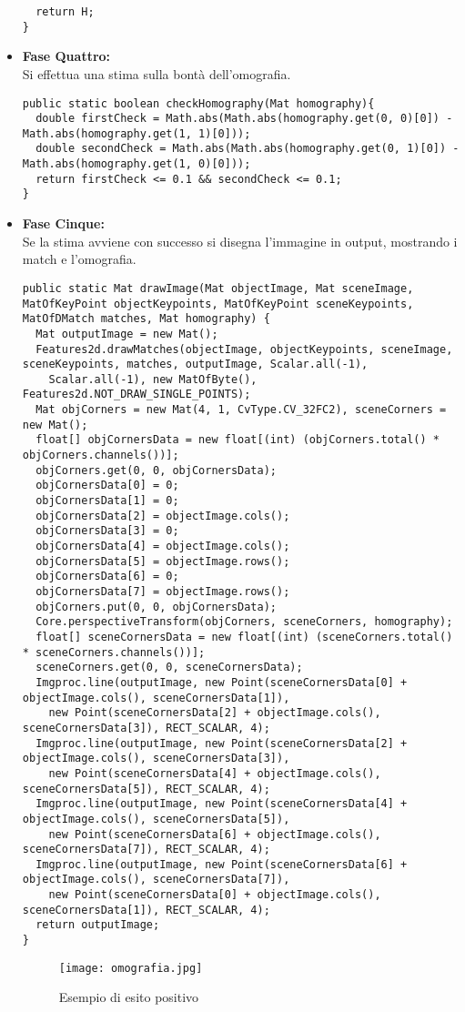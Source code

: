 \begin{itemize}
\begin{lstlisting}
  return H;
}
\end{lstlisting}
	\item \textbf{Fase Quattro:}\\
	Si effettua una stima sulla bontà dell'omografia.
\begin{lstlisting}
public static boolean checkHomography(Mat homography){
  double firstCheck = Math.abs(Math.abs(homography.get(0, 0)[0]) - Math.abs(homography.get(1, 1)[0]));
  double secondCheck = Math.abs(Math.abs(homography.get(0, 1)[0]) - Math.abs(homography.get(1, 0)[0]));
  return firstCheck <= 0.1 && secondCheck <= 0.1;
}
\end{lstlisting}
	\item \textbf{Fase Cinque:}\\
	Se la stima avviene con successo si disegna l'immagine in output, mostrando i match e l'omografia.
\begin{lstlisting}
public static Mat drawImage(Mat objectImage, Mat sceneImage, MatOfKeyPoint objectKeypoints, MatOfKeyPoint sceneKeypoints, MatOfDMatch matches, Mat homography) {
  Mat outputImage = new Mat();
  Features2d.drawMatches(objectImage, objectKeypoints, sceneImage, sceneKeypoints, matches, outputImage, Scalar.all(-1),
    Scalar.all(-1), new MatOfByte(), Features2d.NOT_DRAW_SINGLE_POINTS);
  Mat objCorners = new Mat(4, 1, CvType.CV_32FC2), sceneCorners = new Mat();
  float[] objCornersData = new float[(int) (objCorners.total() * objCorners.channels())];
  objCorners.get(0, 0, objCornersData);
  objCornersData[0] = 0;
  objCornersData[1] = 0;
  objCornersData[2] = objectImage.cols();
  objCornersData[3] = 0;
  objCornersData[4] = objectImage.cols();
  objCornersData[5] = objectImage.rows();
  objCornersData[6] = 0;
  objCornersData[7] = objectImage.rows();
  objCorners.put(0, 0, objCornersData);
  Core.perspectiveTransform(objCorners, sceneCorners, homography);
  float[] sceneCornersData = new float[(int) (sceneCorners.total() * sceneCorners.channels())];
  sceneCorners.get(0, 0, sceneCornersData);
  Imgproc.line(outputImage, new Point(sceneCornersData[0] + objectImage.cols(), sceneCornersData[1]),
    new Point(sceneCornersData[2] + objectImage.cols(), sceneCornersData[3]), RECT_SCALAR, 4);
  Imgproc.line(outputImage, new Point(sceneCornersData[2] + objectImage.cols(), sceneCornersData[3]),
    new Point(sceneCornersData[4] + objectImage.cols(), sceneCornersData[5]), RECT_SCALAR, 4);
  Imgproc.line(outputImage, new Point(sceneCornersData[4] + objectImage.cols(), sceneCornersData[5]),
    new Point(sceneCornersData[6] + objectImage.cols(), sceneCornersData[7]), RECT_SCALAR, 4);
  Imgproc.line(outputImage, new Point(sceneCornersData[6] + objectImage.cols(), sceneCornersData[7]),
    new Point(sceneCornersData[0] + objectImage.cols(), sceneCornersData[1]), RECT_SCALAR, 4);
  return outputImage;
}
\end{lstlisting}
	      \begin{figure}[H]
		      \begin{center}
			      \texttt{[image: omografia.jpg]}
			      \caption{Esempio di esito positivo}
			      \label{fg:omografia.jpg}
		      \end{center}
	      \end{figure}
\end{itemize}
